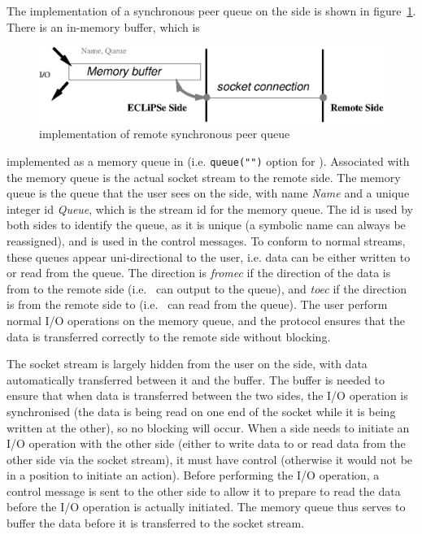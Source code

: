 The implementation of a synchronous peer queue on the {\eclipse} side is
shown in figure~\ref{syncpeer}. There is an in-memory buffer, which is
\begin{figure}[hbt]
\begin{center}
\includegraphics{syncpeer}
\end{center}
\caption{{\eclipse} implementation of remote synchronous peer queue}
\label{syncpeer}
\end{figure}
implemented as a memory queue in {\eclipse} (i.e. {\tt queue("")} option
for ). Associated with the memory queue is the actual socket
stream to the remote side.
The memory queue is the queue that the user sees on the {\eclipse}
side, with name {\it Name} and a unique integer id {\it Queue}, which is
the stream id for the memory queue. The id is used by both sides to identify
the queue, as it is unique (a symbolic name can always be reassigned), and
is used in the control messages. To conform to normal {\eclipse} streams,
these queues appear uni-directional to the user, i.e. data can be either
written to or read from the queue. The direction is {\it fromec} if the
direction of the data is from {\eclipse} to the remote side (i.e.\ 
{\eclipse} can output to the queue), and {\it toec}
if the direction is from the remote side to {\eclipse} (i.e.\ {\eclipse}
can read from the queue). The user perform normal I/O operations on the
memory queue, and the protocol ensures that the data is transferred
correctly to the remote side without blocking.

The socket stream is largely hidden from the user on the {\eclipse} side,
with data automatically transferred between it and the buffer. The buffer
is needed to ensure that when data is transferred between the two sides,
the I/O operation is synchronised (the data is being read on one end of the
socket while it is being written at the other), so no blocking will occur.
When a side needs to initiate an I/O operation with the other side (either
to write data to or read data from the other side via the socket stream), it must have control
(otherwise it would not be in a position to initiate an action). Before
performing the I/O operation, a control message is sent to the other side to
allow it to prepare to read the data before the I/O operation is actually
initiated. The memory queue thus serves to buffer the data before it is
transferred to the socket stream.

